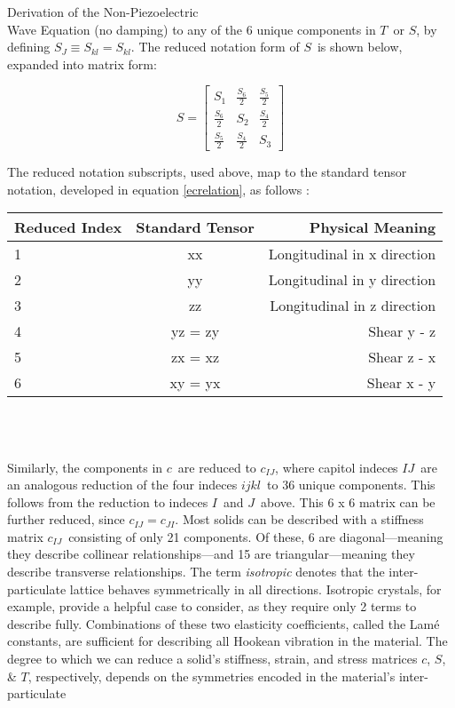 \documentclass[a4paper,10pt]{report}
\numberwithin{equation}{section}
\begin{document}
{\begin{chapter}
\begin{section}{Derivation of the Non-Piezoelectric \\Wave Equation (no damping)}
to any of the 6 unique components in $T$\  or $S$, by defining $S_{J} \equiv
S_{kl} = S_{kl}$. The reduced notation form of $S$\  is shown below, expanded into matrix form\cite[p.~542]{Kino1987}:
\begin{singlespace}
\begin{equation}
 S = \begin{bmatrix}
      S_{1} & \frac{S_{6}}{2} & \frac{S_{5}}{2} \\[0.5em]
      \frac{S_{6}}{2} & S_{2} & \frac{S_{4}}{2} \\[0.5em]
      \frac{S_{5}}{2} & \frac{S_{4}}{2} & S_{3}
     \end{bmatrix}
\end{equation}
\end{singlespace}
The reduced notation subscripts, used above, map to the standard tensor notation, developed in equation \eqref{ecrelation}, as follows\cite[p.~17]{Ballantine1997} \cite[p.~543]{Kino1987}:
\begin{singlespace}
\begin{tabular}{l | c | r}
\hline
Reduced Index & Standard Tensor & Physical Meaning\\
\hline
1 & xx & Longitudinal in x direction\\
2 & yy & Longitudinal in y direction\\
3 & zz & Longitudinal in z direction\\
4 & yz = zy & Shear y - z\\
5 & zx = xz & Shear z - x\\
6 & xy = yx & Shear x - y
\end{tabular}
{}\\
{}\\
\end{singlespace}
Similarly, the components in $c$\  are reduced to $c_{IJ}$, where capitol indeces
$IJ$\  are an analogous reduction of the four indeces $ijkl$\  to 36 unique components. This follows from the reduction to indeces $I$\  and $J$\  above. This 6 x 6 matrix can be further reduced, since $c_{IJ} = c_{JI}$. Most solids can be described with a stiffness matrix $c_{IJ}$\  consisting of only 21 components. Of these, 6 are diagonal---meaning they describe collinear relationships---and 15 are triangular---meaning they describe transverse relationships. The term \emph{isotropic} denotes that the inter-particulate lattice behaves symmetrically in all directions. Isotropic crystals, for example, provide a helpful case to consider, as they require only 2 terms to describe fully. Combinations of these two elasticity coefficients, called the Lam\'{e} constants, are sufficient for describing all Hookean vibration in the material. The degree to which we can reduce a solid's stiffness, strain, and stress matrices $c$, $S$, \& $T$, respectively, depends on the symmetries encoded in the material's inter-particulate 

\end{section}
\end{chapter}}
\end{document}
